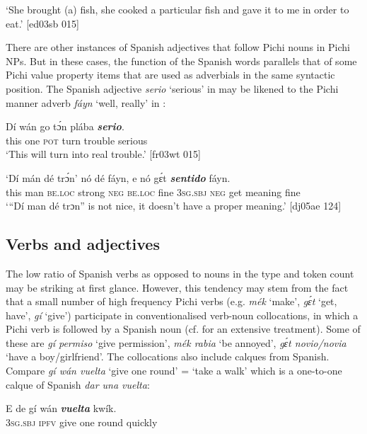 \glt ‘She brought (a) fish, she cooked a particular fish and gave it to me 
in order to eat.’ [ed03sb 015]
\z

There are other instances of Spanish adjectives that follow Pichi nouns in Pichi NPs. But in these cases, the function of the Spanish words parallels that of some Pichi value property items that are used as adverbials in the same syntactic position. The Spanish adjective \textit{serio} ‘serious’ in  may be likened to the Pichi manner adverb \textit{fáyn} ‘well, really’ in :


\ea%
    \label{ex:key:1706}
    \gll Dí  wán    go  tɔ́n    plába  \textbf{\textit{serio}}.\\
this  one    \textsc{pot}  turn    trouble  serious\\

\glt ‘This will turn into real trouble.’ [fr03wt 015]
\z


\ea%
    \label{ex:key:1707}
    \gll ‘Dí    mán    dé    trɔ́n’  nó  dé    fáyn,  e    nó  gɛ́t
\textbf{\textit{sentido}}    fáyn. \\
 \phantom{‘}this  man    \textsc{be.loc}  strong  \textsc{neg}  \textsc{be.loc}  fine    \textsc{3sg.sbj}  \textsc{neg}  get
meaning    fine\\

\glt ‘“Dí man dé trɔn” is not nice, it doesn’t have a proper meaning.’ [dj05ae 124]
\z

\subsection{Verbs and adjectives}\label{sec:13.2.2}

The low ratio of Spanish verbs as opposed to nouns in the type and token count may be striking at first glance. However, this tendency may stem from the fact that a small number of high frequency Pichi verbs (e.g. \textit{mék} ‘make’, \textit{gɛ́t} ‘get, have’, \textit{gí} ‘give’) participate in conventionalised verb-noun collocations, {\fff} in which a Pichi verb is followed by a Spanish noun (cf.  for an extensive treatment). Some of these are \textit{gí permiso} ‘give permission’, \textit{mék rabia} ‘be annoyed’, \textit{gɛ́t novio/novia} ‘have a boy/girlfriend’. The collocations also include calques from Spanish. Compare \textit{gí wán vuelta} ‘give one round’ = ‘take a walk’ which is a one-to-one calque of Spanish \textit{dar una vuelta}:


\ea%
    \label{ex:key:1708}
    \gll E    de  gí  wán    \textbf{\textit{vuelta}}  kwík.\\
\textsc{3sg.sbj}  \textsc{ipfv}  give  one    round  quickly\\


